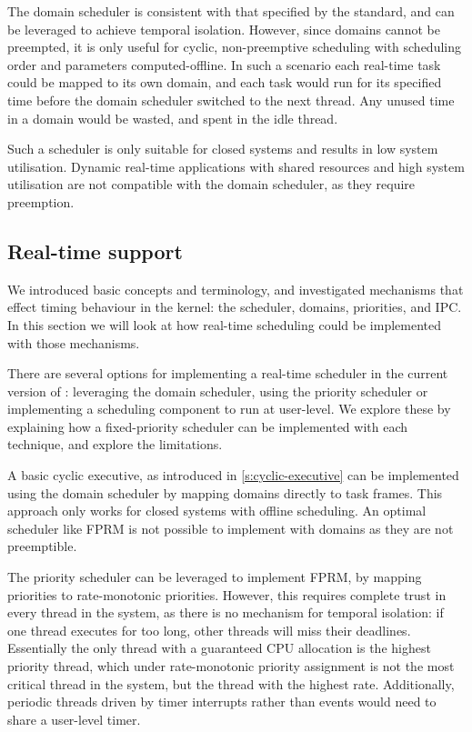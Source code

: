 The domain scheduler is consistent with that specified by the \citet{ARINC653} standard, and 
can be leveraged to achieve temporal isolation. However, since domains cannot be
preempted, it is only useful for cyclic, non-preemptive scheduling with scheduling order and
parameters computed-offline.
In such a scenario each real-time task could be mapped to its own domain, and each task would run for its specified time before the domain scheduler switched to the next thread.
Any unused time in a domain would be wasted, and spent in the idle thread.

Such a scheduler is only suitable for closed systems and results in low system utilisation.
Dynamic real-time applications with shared resources and high system utilisation are not compatible
with the domain scheduler, as they require preemption.

\subsection{Real-time support}

We introduced basic \selfour concepts and terminology, and investigated mechanisms that effect
timing behaviour in the kernel: the scheduler, domains, priorities, \yield and IPC. 
In this section we will look at how real-time scheduling could be implemented with those mechanisms.

There are several options for implementing a real-time scheduler in the current version of \selfour:
leveraging the domain scheduler, using the priority scheduler or implementing a scheduling component
to run at user-level. We explore these by explaining how a fixed-priority scheduler can be
implemented with each technique, and explore the limitations. 

A basic cyclic executive, as introduced in \cref{s:cyclic-executive} can be implemented using the
domain scheduler by mapping domains directly to task frames. This approach only works for closed
systems with offline scheduling. An optimal scheduler like \gls{FPRM} is not possible to implement
with domains as they are not preemptible. 

The priority scheduler can be leveraged to implement \gls{FPRM}, by mapping \selfour priorities to 
rate-monotonic priorities. 
However, this requires complete trust in every thread in the system, as there is no mechanism for
temporal isolation: if one thread executes for too long, other threads will miss their deadlines.
Essentially the only thread with a guaranteed CPU allocation is the highest priority thread, which
under rate-monotonic priority assignment is not the most critical thread in the system, but the
thread with the highest rate.  Additionally, periodic threads driven by timer interrupts rather than
events would need to share a user-level timer.

